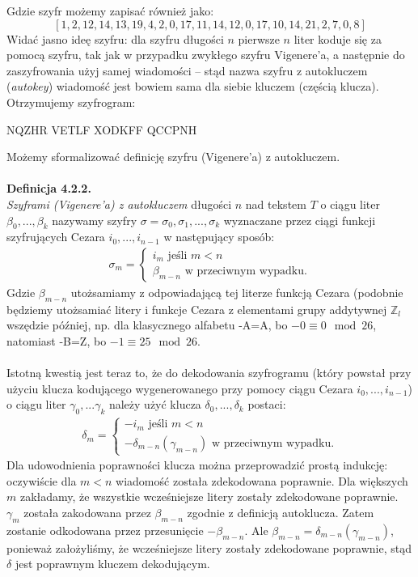 \documentclass[a4paper]{article}
\begin{document}
Gdzie szyfr możemy zapisać również jako:
$$[1, 2, 12, 14, 13, 19, 4, 2, 0, 17, 11, 14, 12, 0, 17, 10, 14, 21, 2, 7, 0, 8]$$
Widać jasno ideę szyfru: dla szyfru długości $n$ pierwsze $n$ liter koduje się za pomocą szyfru, tak jak w przypadku zwykłego szyfru Vigenere'a, a następnie do zaszyfrowania użyj samej wiadomości – stąd nazwa szyfru z autokluczem (\textit{autokey}) wiadomość jest bowiem sama dla siebie kluczem (częścią klucza). Otrzymujemy szyfrogram:\\
\begin{center}
    NQZHR VETLF XODKFF QCCPNH
\end{center}
Możemy sformalizować definicję szyfru (Vigenere'a) z autokluczem. \\\\
\textbf{Definicja 4.2.2.}\\
\textit{Szyframi (Vigenere'a) z autokluczem} długości $n$ nad tekstem $T$ o ciągu liter $\beta_0, ..., \beta_k$ nazywamy szyfry $\sigma = \sigma_0, \sigma_1, ..., \sigma_k$ wyznaczane przez ciągi funkcji szyfrujących Cezara $i_0, ..., i_{n-1}$ w następujący sposób:
\begin{align*}
\sigma_m =
\begin{cases}
  i_m \text{ jeśli } m < n  \\
  \beta_{m-n} \text{ w przeciwnym wypadku}.
\end{cases}
\end{align*}
Gdzie $\beta_{m-n}$ utożsamiamy z odpowiadającą tej literze funkcją Cezara (podobnie będziemy utożsamiać litery i funkcje Cezara z elementami grupy addytywnej $\mathbb{Z}_l$ wszędzie później, np. dla klasycznego alfabetu -A=A, bo $-0 \equiv 0 \mod 26$, natomiast -B=Z, bo $-1 \equiv 25 \mod 26$.
\\\\
Istotną kwestią jest teraz to, że do dekodowania szyfrogramu (który powstał przy użyciu klucza kodującego wygenerowanego przy pomocy ciągu Cezara $i_0, ..., i_{n-1}$) o ciągu liter $\gamma_0, ... \gamma_k$ należy użyć klucza $\delta_0, ..., \delta_k$ postaci:
\begin{align*}
\delta_m =
\begin{cases}
  -i_m \text{ jeśli } m < n  \\
  -\delta_{m-n}(\gamma_{m-n}) \text{ w przeciwnym wypadku}.
\end{cases}
\end{align*}
Dla udowodnienia poprawności klucza można przeprowadzić prostą indukcję: oczywiście dla $m < n$ wiadomość została zdekodowana poprawnie. Dla większych $m$ zakładamy, że wszystkie wcześniejsze litery zostały zdekodowane poprawnie. $\gamma_m$ została zakodowana przez $\beta_{m-n}$ zgodnie z definicją autoklucza. Zatem zostanie odkodowana przez przesunięcie $-\beta_{m-n}$. Ale $\beta_{m-n} = \delta_{m-n}(\gamma_{m-n})$, ponieważ założyliśmy, że wcześniejsze litery zostały zdekodowane poprawnie, stąd $\delta$ jest poprawnym kluczem dekodującym. \\\\
\end{document}

